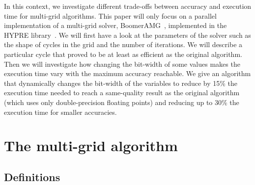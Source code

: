 \documentclass[10pt,conference]{IEEEtran}
\begin{document}
In this context, we investigate different trade-offs between accuracy and execution time for multi-grid algorithms. This paper will only focus on a parallel implementation of a multi-grid solver,
BoomerAMG~\cite{boomerAMG}, implemented in the HYPRE library~\cite{Falgout2002}. We will first have a look at the parameters of the solver such as the shape of cycles in the grid and the
number of iterations. We will describe a particular cycle that proved to be at least as efficient as the original algorithm. Then we will investigate how changing the bit-width of
some values makes the execution time vary with the maximum accuracy reachable. We give an algorithm that dynamically changes the bit-width of the variables to reduce by 15\% the execution
time needed to reach a same-quality result as the original algorithm (which uses only double-precision floating points) and reducing up to 30\% the execution time for smaller accuracies.

\section{The multi-grid algorithm}

\subsection{Definitions}
\end{document}
